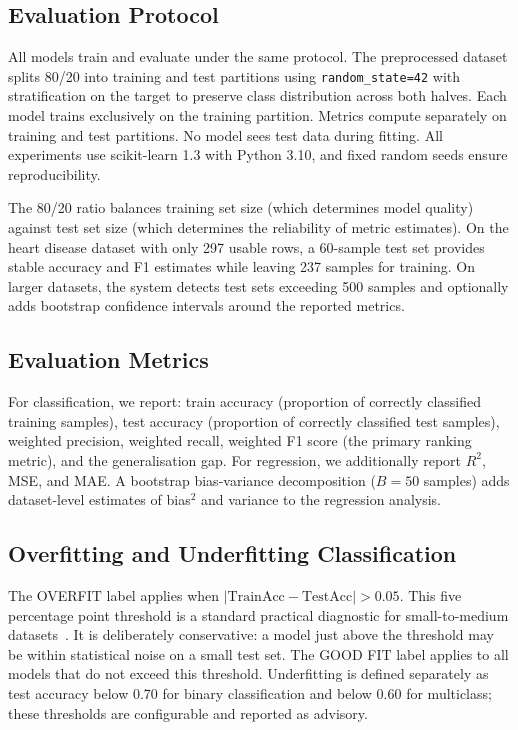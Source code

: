 \documentclass[conference]{IEEEtran}
\begin{document}
\subsection{Evaluation Protocol}

All models train and evaluate under the same protocol. The preprocessed dataset splits 80/20 into training and test partitions using \texttt{random\_state=42} with stratification on the target to preserve class distribution across both halves. Each model trains exclusively on the training partition. Metrics compute separately on training and test partitions. No model sees test data during fitting. All experiments use scikit-learn 1.3 with Python 3.10, and fixed random seeds ensure reproducibility.

The 80/20 ratio balances training set size (which determines model quality) against test set size (which determines the reliability of metric estimates). On the heart disease dataset with only 297 usable rows, a 60-sample test set provides stable accuracy and F1 estimates while leaving 237 samples for training. On larger datasets, the system detects test sets exceeding 500 samples and optionally adds bootstrap confidence intervals around the reported metrics.

\subsection{Evaluation Metrics}

For classification, we report: train accuracy (proportion of correctly classified training samples), test accuracy (proportion of correctly classified test samples), weighted precision, weighted recall, weighted F1 score (the primary ranking metric), and the generalisation gap. For regression, we additionally report $R^2$, MSE, and MAE. A bootstrap bias-variance decomposition ($B=50$ samples) adds dataset-level estimates of bias$^2$ and variance to the regression analysis.

\subsection{Overfitting and Underfitting Classification}

The OVERFIT label applies when $|\text{TrainAcc} - \text{TestAcc}| > 0.05$. This five percentage point threshold is a standard practical diagnostic for small-to-medium datasets~\cite{b22}. It is deliberately conservative: a model just above the threshold may be within statistical noise on a small test set. The GOOD FIT label applies to all models that do not exceed this threshold. Underfitting is defined separately as test accuracy below 0.70 for binary classification and below 0.60 for multiclass; these thresholds are configurable and reported as advisory.
\end{document}
